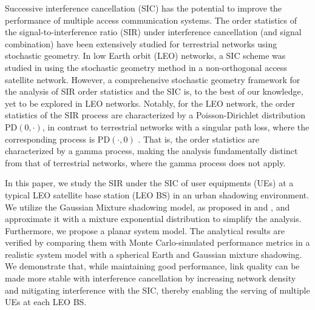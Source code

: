 \documentclass[lettersize,journal]{IEEEtran}
\begin{document}
Successive interference cancellation (SIC) has the potential to improve the performance of multiple access communication systems.
The order statistics of the signal-to-interference ratio (SIR) under interference cancellation (and signal combination) have been extensively studied for terrestrial networks \cite{7305791} using stochastic geometry. In low Earth orbit (LEO) networks, a SIC scheme was studied in \cite{11030605} using the stochastic geometry method in a non-orthogonal access satellite network. However, a comprehensive stochastic geometry framework for the analysis of SIR order statistics and the SIC is, to the best of our knowledge, yet to be explored in LEO networks. Notably, for the LEO network, the order statistics of the SIR process are characterized by a Poisson-Dirichlet distribution PD$(0, \cdot)$, in contrast to terrestrial networks with a singular path loss, where the corresponding process is PD$(\cdot,0)$ \cite{7305791}. That is, the order statistics are characterized by a gamma process, making the analysis fundamentally distinct from that of terrestrial networks, where the gamma process does not apply. 







In this paper, we study the SIR under the SIC of user equipments (UEs) at a typical LEO satellite base station (LEO BS) in an urban shadowing environment. We utilize the Gaussian Mixture shadowing model, as proposed in \cite{modelinguplink} and \cite{9684552}, and approximate it with a mixture exponential distribution to simplify the analysis.  Furthermore, we propose a planar system model. 
The analytical results are verified by comparing them with Monte Carlo-simulated performance metrics in a realistic system model with a spherical Earth and Gaussian mixture shadowing.
We demonstrate that, while maintaining good performance, link quality can be made more stable with interference cancellation by increasing network density and mitigating interference with the SIC, thereby enabling the serving of multiple UEs at each LEO BS.

\end{document}
